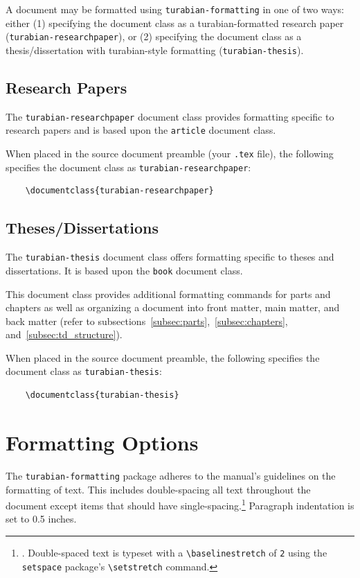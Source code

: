 \documentclass{article}
\newcommand{\textcmd}[1]{\texttt{\textbackslash #1}}
\begin{document}
A document may be formatted using \texttt{turabian-formatting} in one of two ways: either (1) specifying the document class as a turabian-formatted research paper (\texttt{turabian-researchpaper}), or (2) specifying the document class as a thesis/dissertation with turabian-style formatting (\texttt{turabian-thesis}).


\subsection{Research Papers}

%
The \texttt{turabian-researchpaper} document class provides formatting specific to research papers and is based upon the \texttt{article} document class.

When placed in the source document preamble (your \texttt{.tex} file), the following specifies the document class as \texttt{turabian-researchpaper}:
\begin{lstlisting}
	\documentclass{turabian-researchpaper}
\end{lstlisting}


\subsection{Theses/Dissertations}

%
The \texttt{turabian-thesis} document class offers formatting specific to theses and dissertations. It is based upon the \texttt{book} document class. 

This document class provides additional formatting commands for parts and chapters as well as organizing a document into front matter, main matter, and back matter (refer to subsections~\ref{subsec:parts},~\ref{subsec:chapters}, and~\ref{subsec:td_structure}).

When placed in the source document preamble, the following specifies the document class as \texttt{turabian-thesis}:
\begin{lstlisting}
	\documentclass{turabian-thesis}
\end{lstlisting}


\clearpage
\section{Formatting Options}
\label{sec:formatting_options}


The \texttt{turabian-formatting} package adheres to the manual's guidelines on the formatting of text. This includes double-spacing all text throughout the document except items that should have single-spacing.\footnote{%
	\autocite[385]{turabian_manual_2018}. Double-spaced text is typeset with a \textcmd{baselinestretch} of \texttt{2} using the \texttt{setspace} package's \textcmd{setstretch} command.}
Paragraph indentation is set to 0.5 inches.
\end{document}
